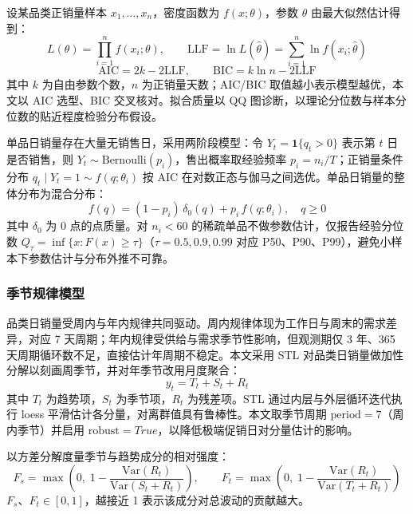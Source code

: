 设某品类正销量样本 $x_1,\dots,x_n$，密度函数为 $f(x;\theta)$，参数 $\theta$ 由最大似然估计得到：
\begin{equation}\label{eq:mle}
  L(\theta)=\prod_{i=1}^{n}f(x_i;\theta),\qquad
  \mathrm{LLF}=\ln L(\hat\theta)=\sum_{i=1}^{n}\ln f(x_i;\hat\theta)
\end{equation}
\begin{equation}\label{eq:aic}
  \mathrm{AIC}=2k-2\mathrm{LLF},\qquad
  \mathrm{BIC}=k\ln n-2\mathrm{LLF}
\end{equation}
其中 $k$ 为自由参数个数，$n$ 为正销量天数；AIC/BIC 取值越小表示模型越优，本文以 AIC 选型、BIC 交叉核对。拟合质量以 QQ 图诊断，以理论分位数与样本分位数的贴近程度检验分布假设。

单品日销量存在大量无销售日，采用两阶段模型\cite{mullahy1986}：令 $Y_t=\mathbf{1}\{q_t>0\}$ 表示第 $t$ 日是否销售，则 $Y_t\sim\mathrm{Bernoulli}(p_i)$，售出概率取经验频率 $p_i=n_i/T$；正销量条件分布 $q_t\mid Y_t=1\sim f(q;\theta_i)$ 按 AIC 在对数正态与伽马之间选优。单品日销量的整体分布为混合分布：
\begin{equation}\label{eq:mixture}
  f(q)=(1-p_i)\,\delta_0(q)+p_i\,f(q;\theta_i),\quad q\ge0
\end{equation}
其中 $\delta_0$ 为 0 点的点质量。对 $n_i<60$ 的稀疏单品不做参数估计，仅报告经验分位数 $Q_\tau=\inf\{x:F(x)\ge\tau\}$（$\tau=0.5,0.9,0.99$ 对应 P50、P90、P99），避免小样本下参数估计与分布外推不可靠。

\subsubsection{季节规律模型}

品类日销量受周内与年内规律共同驱动。周内规律体现为工作日与周末的需求差异，对应 7 天周期；年内规律受供给与需求季节性影响，但观测期仅 3 年、365 天周期循环数不足，直接估计年周期不稳定。本文采用 STL\cite{cleveland1990,hyndman2018} 对品类日销量做加性分解以刻画周季节，并对年季节改用月度聚合：
\begin{equation}\label{eq:stl}
  y_t = T_t + S_t + R_t
\end{equation}
其中 $T_t$ 为趋势项，$S_t$ 为季节项，$R_t$ 为残差项。STL 通过内层与外层循环迭代执行 loess 平滑估计各分量，对离群值具有鲁棒性。本文取季节周期 $\mathrm{period}=7$（周内季节）并启用 $\mathrm{robust}=True$，以降低极端促销日对分量估计的影响。

以方差分解度量季节与趋势成分的相对强度\cite{wang2006}：
\begin{equation}\label{eq:strength}
  F_s=\max\left(0,\;1-\frac{\mathrm{Var}(R_t)}{\mathrm{Var}(S_t+R_t)}\right),\qquad
  F_t=\max\left(0,\;1-\frac{\mathrm{Var}(R_t)}{\mathrm{Var}(T_t+R_t)}\right)
\end{equation}
$F_s$、$F_t\in[0,1]$，越接近 1 表示该成分对总波动的贡献越大。


